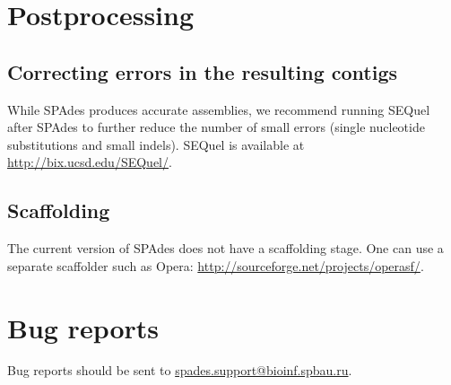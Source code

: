 \documentclass{article}
\def\spades{SPAdes}
\begin{document}
\section{Postprocessing}

\subsection{Correcting errors in the resulting contigs}
While {\spades} produces accurate assemblies, 
we recommend running SEQuel after {\spades} to further reduce the number of 
small errors (single nucleotide substitutions and small indels). SEQuel is available at
\url{http://bix.ucsd.edu/SEQuel/}.


\subsection{Scaffolding}
The current version of {\spades} does not have a scaffolding stage.
One can use a separate scaffolder such as Opera: \url{http://sourceforge.net/projects/operasf/}.

\section{Bug reports}
Bug reports should be sent to \url{spades.support@bioinf.spbau.ru}.




\end{document}
